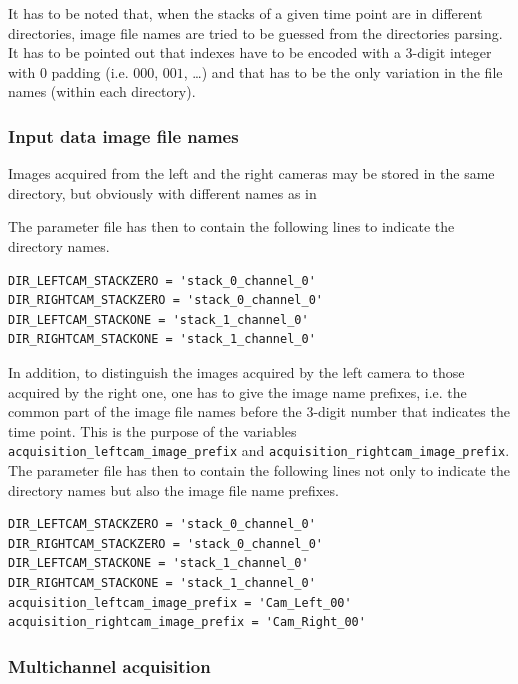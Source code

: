 It has to be noted that, when the stacks of a given time point are in
different directories, image file names are tried to be guessed from
the directories parsing. It has to be pointed out that indexes have to
be encoded with a 3-digit integer with 0 padding (i.e. $000$, $001$,
\ldots) and that has to be the only variation in the file names
(within each directory).

\subsubsection{Input data image file names}

Images acquired from the left and the right cameras may be stored in
the same directory, but obviously with different names as in 

\mbox{}
\mbox{}

The parameter file has then to contain the following lines to indicate
the directory names.
\begin{verbatim}
DIR_LEFTCAM_STACKZERO = 'stack_0_channel_0'
DIR_RIGHTCAM_STACKZERO = 'stack_0_channel_0'
DIR_LEFTCAM_STACKONE = 'stack_1_channel_0'
DIR_RIGHTCAM_STACKONE = 'stack_1_channel_0'
\end{verbatim}

In addition, to distinguish the images acquired by the left camera to
those acquired by the right one, one has to give the image name
prefixes, i.e. the common part of the image file names before the
3-digit number that indicates the time point.
This is the purpose of the  variables
\verb|acquisition_leftcam_image_prefix| and 
\verb|acquisition_rightcam_image_prefix|.
The parameter file has then to contain the following lines not only to indicate
the directory names but also the image file name prefixes.

\begin{verbatim}
DIR_LEFTCAM_STACKZERO = 'stack_0_channel_0'
DIR_RIGHTCAM_STACKZERO = 'stack_0_channel_0'
DIR_LEFTCAM_STACKONE = 'stack_1_channel_0'
DIR_RIGHTCAM_STACKONE = 'stack_1_channel_0'
acquisition_leftcam_image_prefix = 'Cam_Left_00'
acquisition_rightcam_image_prefix = 'Cam_Right_00'
\end{verbatim}

\subsubsection{Multichannel acquisition}

